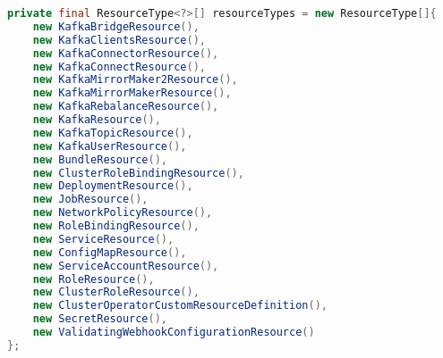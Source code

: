 \begin{lstlisting}[language=Java,label=resourcemanager:supported:resources,caption=List of supported resources inside ResourceManager,frame=tb]
private final ResourceType<?>[] resourceTypes = new ResourceType[]{
    new KafkaBridgeResource(),
    new KafkaClientsResource(),
    new KafkaConnectorResource(),
    new KafkaConnectResource(),
    new KafkaMirrorMaker2Resource(),
    new KafkaMirrorMakerResource(),
    new KafkaRebalanceResource(),
    new KafkaResource(),
    new KafkaTopicResource(),
    new KafkaUserResource(),
    new BundleResource(),
    new ClusterRoleBindingResource(),
    new DeploymentResource(),
    new JobResource(),
    new NetworkPolicyResource(),
    new RoleBindingResource(),
    new ServiceResource(),
    new ConfigMapResource(),
    new ServiceAccountResource(),
    new RoleResource(),
    new ClusterRoleResource(),
    new ClusterOperatorCustomResourceDefinition(),
    new SecretResource(),
    new ValidatingWebhookConfigurationResource()
};
\end{lstlisting}


